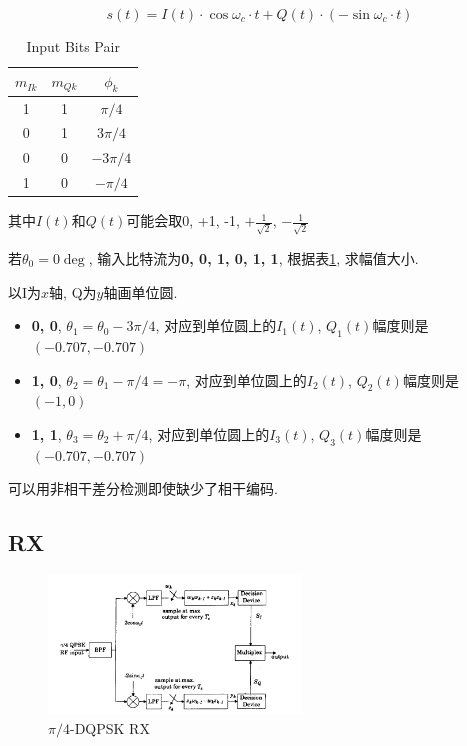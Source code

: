 \documentclass[a4paper]{report}
\begin{document}
\begin{equation}
	s(t)=I(t)\cdot \cos{\omega_c\cdot t}+Q(t)\cdot(-\sin{\omega_c\cdot t})
\end{equation}

\begin{table}[htbp]
  \centering
    \begin{tabular}{ccc}
	\hline
    $m_{Ik}$ & $m_{Qk}$ & $\phi_k$ \\
    \hline
    1     & 1     & $\pi/4$ \\
    0     & 1     & $3\pi/4$ \\
    0     & 0     & $-3\pi/4$ \\
    1     & 0     & $-\pi/4$ \\
    \hline
    \end{tabular}%
  \caption{Input Bits Pair}
  \label{tab:dqpsk_pi_4}%
\end{table}

其中$I(t)$和$Q(t)$可能会取0, +1, -1, $+\frac{1}{\sqrt{2}}$, $-\frac{1}{\sqrt{2}}$

若$\theta_0=0\deg$, 输入比特流为\textbf{0, 0, 1, 0, 1, 1}, 根据表\ref{tab:dqpsk_pi_4}, 求幅值大小. 

以I为$x$轴, Q为$y$轴画单位圆. 

\begin{itemize}
	\item \textbf{0, 0}, $\theta_1=\theta_0-3\pi/4$, 对应到单位圆上的$I_1(t)$, $Q_1(t)$幅度则是$(-0.707,-0.707)$
	\item \textbf{1, 0}, $\theta_2=\theta_1-\pi/4=-\pi$, 对应到单位圆上的$I_2(t)$, $Q_2(t)$幅度则是$(-1,0)$
	\item \textbf{1, 1}, $\theta_3=\theta_2+\pi/4$, 对应到单位圆上的$I_3(t)$, $Q_3(t)$幅度则是$(-0.707,-0.707)$
\end{itemize}

可以用非相干差分检测即使缺少了相干编码. 


\subsection{RX}

\begin{figure}[H]
\centering
\includegraphics[width=0.6\textwidth]{qdpsk_pi_4.png}
\caption{$\pi/4$-DQPSK RX}
\end{figure}
\end{document}
